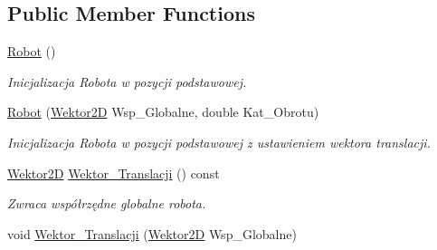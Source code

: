 \subsection*{Public Member Functions}
\begin{DoxyCompactItemize}
\item 
\hypertarget{class_robot_a4fc7c70ae20623f05e06f2ecb388b6c4}{\hyperlink{class_robot_a4fc7c70ae20623f05e06f2ecb388b6c4}{Robot} ()}\label{class_robot_a4fc7c70ae20623f05e06f2ecb388b6c4}

\begin{DoxyCompactList}\small\item\em Inicjalizacja Robota w pozycji podstawowej. \end{DoxyCompactList}\item 
\hypertarget{class_robot_abd8dc62130fa9960f9d304adb71dc208}{\hyperlink{class_robot_abd8dc62130fa9960f9d304adb71dc208}{Robot} (\hyperlink{class_wektor2_d}{Wektor2\+D} Wsp\+\_\+\+Globalne, double Kat\+\_\+\+Obrotu)}\label{class_robot_abd8dc62130fa9960f9d304adb71dc208}

\begin{DoxyCompactList}\small\item\em Inicjalizacja Robota w pozycji podstawowej z ustawieniem wektora translacji. \end{DoxyCompactList}\item 
\hypertarget{class_robot_ac2e234e257be93e7b9cef8ef4528ad84}{\hyperlink{class_wektor2_d}{Wektor2\+D} \hyperlink{class_robot_ac2e234e257be93e7b9cef8ef4528ad84}{Wektor\+\_\+\+Translacji} () const }\label{class_robot_ac2e234e257be93e7b9cef8ef4528ad84}

\begin{DoxyCompactList}\small\item\em Zwraca współrzędne globalne robota. \end{DoxyCompactList}\item 
\hypertarget{class_robot_a45e98d34711b9424392853008062e3e3}{void \hyperlink{class_robot_a45e98d34711b9424392853008062e3e3}{Wektor\+\_\+\+Translacji} (\hyperlink{class_wektor2_d}{Wektor2\+D} Wsp\+\_\+\+Globalne)}\label{class_robot_a45e98d34711b9424392853008062e3e3}


\end{DoxyCompactItemize}
